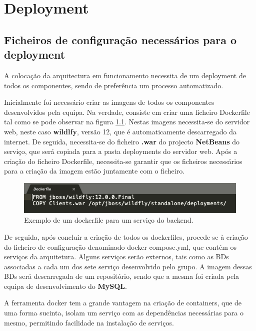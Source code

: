 \chapter{Deployment}
\label{chap:instalacao}

\section{Ficheiros de configuração necessários para o deployment}

\hspace{5mm} A colocação da arquitectura em funcionamento necessita de um deployment de todos os componentes, sendo de preferência um processo automatizado. 

\hspace{5mm} Inicialmente foi necessário criar as imagens de todos os componentes desenvolvidos pela equipa. Na verdade, consiste em criar uma ficheiro Dockerfile tal como se pode observar na figura \ref{fig:dockerfile}. Nestas imagens necessita-se do servidor web, neste caso \textbf{wildlfy}, versão 12, que é automaticamente descarregado da internet. De seguida, necessita-se do ficheiro \textbf{.war} do projecto \textbf{NetBeans} do serviço, que será copiada para a pasta deployments do servidor web. Após a criação do ficheiro Dockerfile, necessita-se garantir que os ficheiros necessários para a criação da imagem estão juntamente com o ficheiro.

\begin{figure}[H]
    \centering
    \includegraphics[scale=0.40]{images/deployment/dockerfile.png}
    \caption{Exemplo de um dockerfile para um serviço do backend.}
    \label{fig:dockerfile}
\end{figure}

\hspace{5mm} De seguida, após concluir a criação de todos os dockerfiles, procede-se à criação do ficheiro de configuração denominado docker-compose.yml, que contém os serviços da arquitetura. Alguns serviços serão externos, tais como as BDs associadas a cada um dos sete serviço desenvolvido pelo grupo. A imagem dessas BDs será descarregada de um repositório, sendo que a mesma foi criada pela equipa de desenvolvimento do \textbf{MySQL}.

\hspace{5mm} A ferramenta docker tem a grande vantagem na criação de containers, que de uma forma sucinta, isolam um serviço com as dependências necessárias para o mesmo, permitindo facilidade na instalação de serviços.


